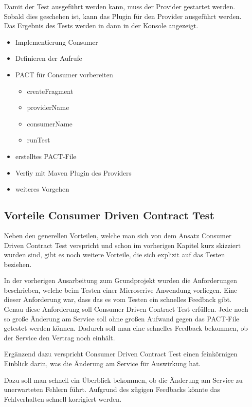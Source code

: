 \documentclass{llncs}
\begin{document}
Damit der Test ausgeführt werden kann, muss der Provider gestartet werden. Sobald dies geschehen ist, kann das Plugin für den Provider ausgeführt werden. Das Ergebnis des Tests werden in dann in der Konsole angezeigt.

\begin{itemize}
\item Implementierung Consumer
\item Definieren der Aufrufe
\item PACT für Consumer vorbereiten
\begin{itemize}
\item createFragment
\item providerName
\item consumerName
\item runTest
\end{itemize}
\item erstelltes PACT-File
\item Verfiy mit Maven Plugin des Providers
\item weiteres Vorgehen
\end{itemize}


\subsection{Vorteile Consumer Driven Contract Test}
Neben den generellen Vorteilen, welche man sich von dem Ansatz Consumer Driven Contract Test verspricht und schon im vorherigen Kapitel kurz skizziert wurden sind, gibt es noch weitere Vorteile, die sich explizit auf das Testen beziehen.

In der vorherigen Ausarbeitung zum Grundprojekt wurden die Anforderungen beschrieben, welche beim Testen einer Microserive Anwendung vorliegen. 
Eine dieser Anforderung war, dass das es vom Testen ein schnelles Feedback gibt. 
Genau diese Anforderung soll Consumer Driven Contract Test erfüllen. 
Jede noch so große Änderung am Service soll ohne großen Aufwand gegen das PACT-File getestet werden können. Dadurch soll man eine schnelles Feedback bekommen, ob der Service den Vertrag noch einhält.

Ergänzend dazu verspricht Consumer Driven Contract Test einen feinkörnigen Einblick darin, was die Änderung am Service für Auswirkung hat.

Dazu soll man schnell ein Überblick bekommen, ob die Änderung am Service zu unerwarteten Fehlern führt. Aufgrund des zügigen Feedbacks könnte das Fehlverhalten schnell korrigiert werden.
\end{document}
